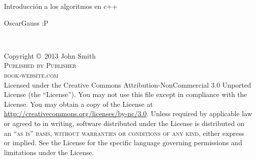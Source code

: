 \documentclass[11pt,fleqn]{book} %
\begin{document}

\renewcommand*{\lstlistingname}{Codigo}
\renewcommand*{\lstlistlistingname}{Lista de \lstlistingname s} 
\renewcommand{\chaptername}{Capítulo}%
\renewcommand*\contentsname{Contenidos} %

\begingroup
\thispagestyle{empty}
\centering
\vspace*{9cm}
\par\normalfont\fontsize{35}{35}\sffamily\selectfont
Introducción a los algoritmos en c++\par %
\vspace*{1cm}
{\Huge OscarGauss :P}\par %
\endgroup


\newpage
~\vfill
\thispagestyle{empty}

\noindent Copyright \copyright\ 2013 John Smith\\ %

\noindent \textsc{Published by Publisher}\\ %

\noindent \textsc{book-website.com}\\ %

\noindent Licensed under the Creative Commons Attribution-NonCommercial 3.0 Unported License (the ``License''). You may not use this file except in compliance with the License. You may obtain a copy of the License at \url{http://creativecommons.org/licenses/by-nc/3.0}. Unless required by applicable law or agreed to in writing, software distributed under the License is distributed on an \textsc{``as is'' basis, without warranties or conditions of any kind}, either express or implied. See the License for the specific language governing permissions and limitations under the License.\\ %
\end{document}
